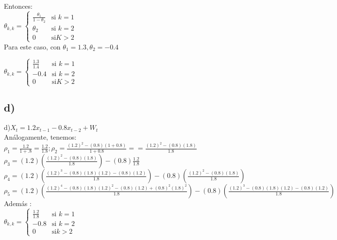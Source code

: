 \documentclass{article}
\begin{document}
Entonces:\\ 


$\theta_{k,k} = \left\{\begin{array}{rl}  \frac{\theta_1}{1-\theta_2} & \text{si } k =1 \\  \theta_2 & \text{si } k =2 \\  0  & \text{si}  K>2 \end{array} \right. $\\

Para este caso, con $\theta_1 =1.3 ,   \theta_2 = -0.4 $

$\theta_{k,k} = \left\{\begin{array}{rl}  \frac{1.3}{1.4} & \text{si } k =1 \\  -0.4 & \text{si } k =2 \\  0  & \text{si}  K>2 \end{array} \right. $\\

\subsection{d)}

d)$X_t = 1.2 x_{t-1} - 0.8 x_{t-2} + W_t$ \\

An{á}logamente, tenemos:\\

$\rho_1 = \frac{1.2}{1+.8} = \frac{1.2}{1.8}    ;   \rho_2 = \frac{(1.2) ^2 - (0.8)(1+0.8)}{1+0.8} = = \frac{(1.2) ^2 - (0.8)(1.8)}{1.8}$\\

$\rho_3 = (1.2)(\frac{(1.2) ^2 - (0.8)(1.8)}{1.8}) - (0.8) \frac{1.2}{1.8} $\\

$\rho_4 = (1.2)(\frac{(1.2) ^3 - (0.8)(1.8)(1.2)- (0.8)(1.2)}{1.8}) - (0.8) (\frac{(1.2)^2 -  (0.8)(1.8)}{1.8} )$\\

$\rho_5 = (1.2)(\frac{(1.2) ^4 - (0.8)(1.8)(1.2)^2- (0.8)(1.2)+ (0.8)^2(1.8)^2}{1.8}) - (0.8) (\frac{(1.2)^3 -  (0.8)(1.8)(1.2)-(0.8)(1.2)}{1.8} )$\\

Adem{á}s :\\

$\theta_{k,k} = \left\{\begin{array}{rl}  \frac{1.2}{1.8} & \text{si } k =1 \\  -0.8 & \text{si } k =2 \\  0  & \text{si}  k>2 \end{array} \right. $\\
\end{document}
